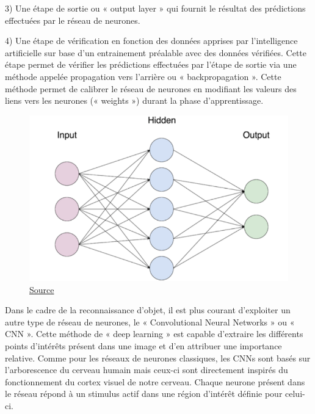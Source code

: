 \documentclass[a4paper,12pt]{article} %
\begin{document}
3)	Une étape de sortie ou « output layer » qui fournit le résultat des prédictions effectuées par le réseau de neurones. \newline

4)	Une étape de vérification en fonction des données apprises par l’intelligence artificielle sur base d’un entrainement préalable avec des données vérifiées. Cette étape permet de vérifier les prédictions effectuées par l’étape de sortie via une méthode appelée propagation vers l’arrière ou « backpropagation ». Cette méthode permet de calibrer le réseau de neurones en modifiant les valeurs des liens vers les neurones (« weights ») durant la phase d’apprentissage. \newline
\begin{figure}[h] %
  \centering %
  \includegraphics[scale=0.30]{ANN.png} %
  \caption{\href{https://towardsdatascience.com/step-by-step-guide-to-building-your-own-neural-network-from-scratch-df64b1c5ab6e}{Source} }
\end{figure}
\newpage
\par
Dans le cadre de la reconnaissance d’objet, il est plus courant d’exploiter un autre type de réseau de neurones, le « Convolutional Neural Networks » ou « CNN ». Cette méthode de « deep learning » est capable d’extraire les différents points d’intérêts présent dans une image et d’en attribuer une importance relative. 
Comme pour les réseaux de neurones classiques, les CNNs sont basés sur l’arborescence du cerveau humain mais ceux-ci sont directement inspirés du fonctionnement du cortex visuel de notre cerveau. Chaque neurone présent dans le réseau répond à un stimulus actif dans une région d’intérêt définie pour celui-ci. \newline
\end{document}
